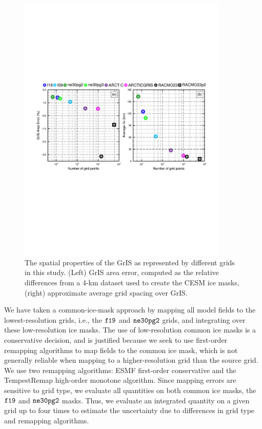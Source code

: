 \documentclass[draft]{agujournal2019}
\begin{document}
\begin{figure}[t]
\begin{center}
         \includegraphics[width=100mm]{figs/temp_grisres.pdf}
\end{center}
\caption{The spatial properties of the GrIS as represented by different grids in this study. (Left) GrIS area error, computed as the relative differences from a 4-km dataset used to create the CESM ice masks, (right) approximate average grid spacing over GrIS.}
\label{fig:grisdx}
\end{figure}

We have taken a common-ice-mask approach by mapping all model fields to the lowest-resolution grids, i.e., the $\tt f19$ and $\tt ne30pg2$ grids, and integrating over these low-resolution ice masks. The use of low-resolution common ice masks is a conservative decision, and is justified because we seek to use first-order remapping algorithms to map fields to the common ice mask, which is not generally reliable when mapping to a higher-resolution grid than the source grid. We use two remapping algorithms: ESMF first-order conservative and the TempestRemap \cite{TempestRemap} high-order monotone algorithm. Since mapping errors are sensitive to grid type, we evaluate all quantities on both common ice masks, the $\tt f19$ and $\tt ne30pg2$ masks. Thus, we evaluate an integrated quantity on a given grid up to four times to estimate the uncertainty due to differences in grid type and remapping algorithms.
\end{document}
